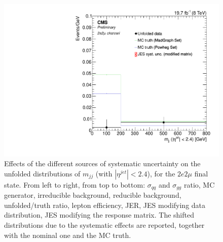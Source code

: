 \begin{figure}[hbtp]
\begin{center}
    \includegraphics[width=0.8\cmsFigWidth]{Figures/Unfolding/Systematics/ZZTo2e2m_CentralMjj_JES_ModMat_Mad_fr}
    \caption{Effects of the different sources of systematic uncertainty on the unfolded distributions of $m_{jj}$ (with $|\eta^{jet}|<2.4$), for the $2e2\mu$ final state. From left to right, from top to bottom: $\sigma_{qq}$ and $\sigma_{gg}$ ratio, MC generator, irreducible background, reducible background, unfolded/truth ratio, lepton efficiency, JER, JES modifying data distribution, JES modifying the response matrix. The shifted distributions due to the systematic effects are reported, together with the nominal one and the MC truth.}
   \label{fig:CentralMjj_syst_2e2m}
  \end{center}
\end{figure}


